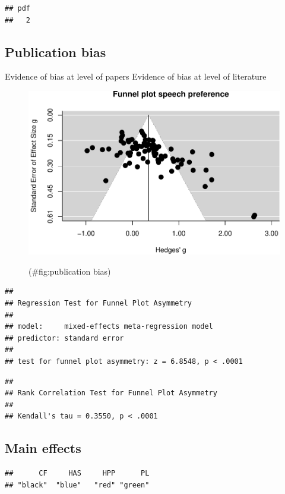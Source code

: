 \documentclass[man]{apa6}
\begin{document}
\begin{verbatim}
## pdf 
##   2
\end{verbatim}

\subsection{Publication bias}\label{publication-bias-1}

Evidence of bias at level of papers Evidence of bias at level of
literature

\begin{figure}

{\centering \includegraphics{MA_speech_pref_files/figure-latex/publication bias-1} 

}

\caption{ }(\#fig:publication bias)
\end{figure}

\begin{verbatim}
## 
## Regression Test for Funnel Plot Asymmetry
## 
## model:     mixed-effects meta-regression model
## predictor: standard error
## 
## test for funnel plot asymmetry: z = 6.8548, p < .0001
\end{verbatim}

\begin{verbatim}
## 
## Rank Correlation Test for Funnel Plot Asymmetry
## 
## Kendall's tau = 0.3550, p < .0001
\end{verbatim}

\subsection{Main effects}\label{main-effects}

\begin{verbatim}
##      CF     HAS     HPP      PL 
## "black"  "blue"   "red" "green"
\end{verbatim}
\end{document}
